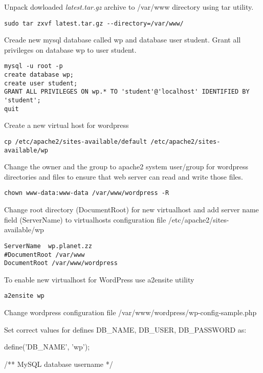 Unpack dowloaded \emph{latest.tar.gz} archive to  /var/www directory using tar utility.

\begin{verbatim}
sudo tar zxvf latest.tar.gz --directory=/var/www/
\end{verbatim}

Creade new mysql database called wp and database user student. Grant all privileges on database wp to user student.

\begin{verbatim}
mysql -u root -p
create database wp;
create user student;
GRANT ALL PRIVILEGES ON wp.* TO 'student'@'localhost' IDENTIFIED BY 'student';
quit
\end{verbatim}

Create a new virtual host for wordpress 
\begin{verbatim}
cp /etc/apache2/sites-available/default /etc/apache2/sites-available/wp
\end{verbatim}

Change the owner and the group to apache2 system user/group for wordpress directories and files to ensure that web server can read and write those files.
\begin{verbatim}
chown www-data:www-data /var/www/wordpress -R
\end{verbatim}

Change root directory (DocumentRoot) for new virtualhost and add server name field (ServerName) to virtualhosts configuration file   /etc/apache2/sites-available/wp


\begin{verbatim}
ServerName	wp.planet.zz
#DocumentRoot /var/www
DocumentRoot /var/www/wordpress
\end{verbatim}


To enable new virtualhost for WordPress use a2ensite utility
\begin{verbatim}
a2ensite wp
\end{verbatim}

Change wordpress configuration file
/var/www/wordpress/wp-config-sample.php

Set correct values for defines DB\_NAME, DB\_USER, DB\_PASSWORD as:

define('DB\_NAME', 'wp');

/** MySQL database username */

